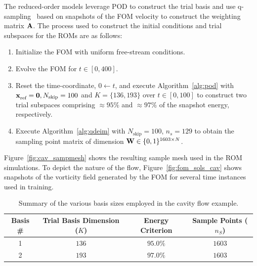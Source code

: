 The reduced-order models leverage POD to construct the trial basis and use q-sampling~\cite{qdeim_drmac} based on snapshots of the FOM velocity to construct the weighting 
matrix $\stweightingMatArg{n}$. The process used to construct the initial conditions and trial subspaces for the ROMs are as follows:
\begin{enumerate}
\item Initialize the FOM with uniform free-stream conditions.
\item Evolve the FOM for $t \in [0,400]$.
\item Reset the time-coordinate, $0 \leftarrow t$, and execute Algorithm~\ref{alg:pod} with $\stateInterceptArg{} = \bz, N_{\text{skip}} = 100$ and $K = \{136,193\}$ over $t \in [0,100]$ to construct two trial subspaces comprising $\approx 95\%$ and $\approx 97\%$ of the snapshot energy, respectively. 
\item Execute Algorithm~\ref{alg:qdeim} with $N_{\text{skip}} = 100$, $n_s = 129$ to obtain the sampling point matrix of dimension $\stweightingMatOneArg{} \in \{0,1\}^{1603 \times \fomdim }$. 
\end{enumerate}
Figure~\ref{fig:cav_sampmesh} shows the resulting sample mesh used in the ROM simulations. To depict the nature of the flow, Figure~\ref{fig:fom_sols_cav} shows snapshots of the vorticity field generated by the FOM for several time instances used in training.  
\begin{table}[]
\begin{centering}
\begin{tabular}{c c c c}
\hline
Basis \# & Trial Basis Dimension ($K$) &  Energy Criterion & Sample Points ($n_S$) \\
\hline
1    & $136$ & $95.0\%$ & $1603$ \\
2    & $193$ & $97.0\%$ & $1603$ \\
\hline
\end{tabular}
\caption{Summary of the various basis sizes employed in the cavity flow example.}
\label{tab:rom_basis_details}
\end{centering}
\end{table}

